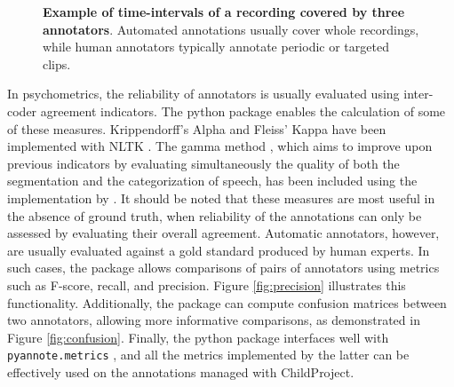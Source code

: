 \documentclass[smallextended]{svjour3}       %
\begin{document}
\begin{figure}[htb]
\centering
{}


\caption{\label{fig:Annotation}\textbf{Example of time-intervals of a recording covered by three annotators}. Automated annotations usually cover whole recordings, while human annotators typically annotate periodic or targeted clips. }

\end{figure}


In psychometrics, the reliability of annotators is usually evaluated using inter-coder agreement indicators. The python package enables the calculation of some of these measures. Krippendorff's Alpha and Fleiss' Kappa \citep{kappa} have been implemented with NLTK \citep{nltk}. The gamma method \citep{gamma}, which aims to improve upon previous indicators by evaluating simultaneously the quality of both the segmentation and the categorization of speech, has been included using the implementation by \citet{pygamma_agreement}.
It should be noted that these measures are most useful in the absence of ground truth, when reliability of the annotations can only be assessed by evaluating their overall agreement. Automatic annotators, however, are usually evaluated against a gold standard produced by human experts. In such cases, the package allows comparisons of pairs of annotators using metrics such as F-score, recall, and precision. Figure \ref{fig:precision} illustrates this functionality. Additionally, the package can compute confusion matrices between two annotators, allowing more informative comparisons, as demonstrated in Figure \ref{fig:confusion}. Finally, the python package interfaces well with \texttt{pyannote.metrics} \citep{pyannote.metrics}, and all the metrics implemented by the latter can be effectively used on the annotations managed with ChildProject.
\end{document}
